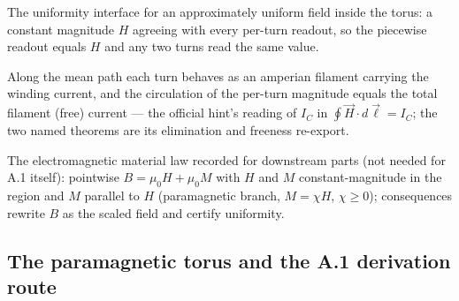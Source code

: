 \begin{definition}
\label{def:IPhO2026Problems_problem_IPhO_2026_3_A_1:UniformFieldMag}
The uniformity interface for an approximately uniform field inside the
torus: a constant magnitude $H$ agreeing with every per-turn readout, so
the piecewise readout equals $H$ and any two turns read the same value.
\end{definition}

\begin{definition}
\label{def:IPhO2026Problems_problem_IPhO_2026_3_A_1:AmperianFilamentLaw}
Along the mean path each turn behaves as an amperian filament carrying the
winding current, and the circulation of the per-turn magnitude equals the
total filament (free) current — the official hint's reading of $I_C$ in
$\oint \vec{H}\cdot d\vec{\ell} = I_C$; the two named theorems are its
elimination and freeness re-export.
\end{definition}

\begin{definition}
\label{def:IPhO2026Problems_problem_IPhO_2026_3_A_1:VacuumCoreIdentity}
The electromagnetic material law recorded for downstream parts (not needed
for A.1 itself): pointwise $B = \mu_0 H + \mu_0 M$ with $H$ and $M$
constant-magnitude in the region and $M$ parallel to $H$ (paramagnetic
branch, $M = \chi H$, $\chi \ge 0$); consequences rewrite $B$ as the scaled
field and certify uniformity.
\end{definition}

\subsection*{The paramagnetic torus and the A.1 derivation route}


